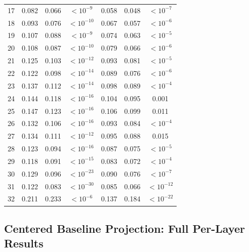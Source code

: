 \documentclass{article}
\begin{document}
\begin{longtable}{c ccc ccc}
17 & 0.082 & 0.066 & $<10^{-9}$    &  0.058 & 0.048 & $<10^{-7}$   \\
18 & 0.093 & 0.076 & $<10^{-10}$   &  0.067 & 0.057 & $<10^{-6}$   \\
19 & 0.107 & 0.088 & $<10^{-9}$    &  0.074 & 0.063 & $<10^{-5}$   \\
20 & 0.108 & 0.087 & $<10^{-10}$   &  0.079 & 0.066 & $<10^{-6}$   \\
21 & 0.125 & 0.103 & $<10^{-12}$   &  0.093 & 0.081 & $<10^{-5}$   \\
22 & 0.122 & 0.098 & $<10^{-14}$   &  0.089 & 0.076 & $<10^{-6}$   \\
23 & 0.137 & 0.112 & $<10^{-14}$   &  0.098 & 0.089 & $<10^{-4}$   \\
24 & 0.144 & 0.118 & $<10^{-16}$   &  0.104 & 0.095 & 0.001        \\
25 & 0.147 & 0.123 & $<10^{-16}$   &  0.106 & 0.099 & 0.011        \\
26 & 0.132 & 0.106 & $<10^{-16}$   &  0.093 & 0.084 & $<10^{-4}$   \\
27 & 0.134 & 0.111 & $<10^{-12}$   &  0.095 & 0.088 & 0.015        \\
28 & 0.123 & 0.094 & $<10^{-16}$   &  0.087 & 0.075 & $<10^{-5}$   \\
29 & 0.118 & 0.091 & $<10^{-15}$   &  0.083 & 0.072 & $<10^{-4}$   \\
30 & 0.129 & 0.096 & $<10^{-23}$   &  0.090 & 0.076 & $<10^{-7}$   \\
31 & 0.122 & 0.083 & $<10^{-30}$   &  0.085 & 0.066 & $<10^{-12}$  \\
32 & 0.211 & 0.233 & $<10^{-6}$    &  0.137 & 0.184 & $<10^{-22}$  \\
\end{longtable}

\subsection{Centered Baseline Projection: Full Per-Layer Results}
\label{app:centered_full}
\end{document}
